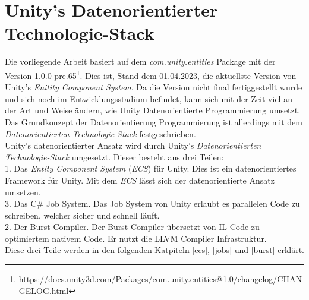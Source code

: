 \section[Unity's Datenorientierter Technologie-Stack]{Unity's Datenorientierter Technologie-Stack}
Die vorliegende Arbeit basiert auf dem \textit{com.unity.entities} Package mit der Version 1.0.0-pre.65\footnote{\url{https://docs.unity3d.com/Packages/com.unity.entities@1.0/changelog/CHANGELOG.html}}. Dies ist, Stand dem 01.04.2023, die aktuellste Version von Unity's \textit{Enitity Component System}. Da die Version nicht final fertiggestellt wurde und sich noch im Entwicklungsstadium befindet, kann sich mit der Zeit viel an der Art und Weise ändern, wie Unity Datenorientierte Programmierung umsetzt. Das Grundkonzept der Datenorientierung Programmierung ist allerdings mit dem \textit{Datenorientierten Technologie-Stack} festgeschrieben.\\
Unity's datenorientierter Ansatz wird durch Unity's \textit{Datenorientierten Technologie-Stack} umgesetzt. Dieser besteht aus drei Teilen:\\
1. Das \textit{Entity Component System} (\textit{ECS}) für Unity. Dies ist ein datenorientiertes Framework für Unity. Mit dem \textit{ECS} lässt sich der datenorientierte Ansatz umsetzen.\\
3. Das C\# Job System. Das Job System von Unity erlaubt es parallelen Code zu schreiben, welcher sicher und schnell läuft.\\
2. Der Burst Compiler. Der Burst Compiler übersetzt von IL Code zu optimiertem nativem Code. Er nutzt die LLVM Compiler Infrastruktur.\\
Diese drei Teile werden in den folgenden Katpiteln \ref{ecs}, \ref{jobs} und \ref{burst} erklärt.
